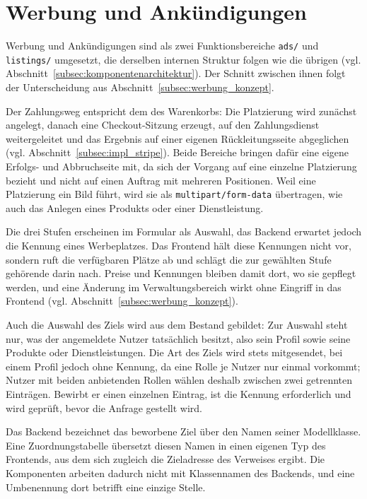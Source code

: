 \section{Werbung und Ankündigungen}
\label{sec:impl_werbung}

Werbung und Ankündigungen sind als zwei Funktionsbereiche
\texttt{ads/} und \texttt{listings/} umgesetzt, die derselben
internen Struktur folgen wie die übrigen (vgl.
Abschnitt~\ref{subsec:komponentenarchitektur}). Der Schnitt zwischen
ihnen folgt der Unterscheidung aus
Abschnitt~\ref{subsec:werbung_konzept}.

Der Zahlungsweg entspricht dem des Warenkorbs: Die Platzierung wird
zunächst angelegt, danach eine Checkout-Sitzung erzeugt, auf den
Zahlungsdienst weitergeleitet und das Ergebnis auf einer eigenen
Rückleitungsseite abgeglichen (vgl.
Abschnitt~\ref{subsec:impl_stripe}). Beide Bereiche bringen dafür
eine eigene Erfolgs- und Abbruchseite mit, da sich der Vorgang auf
eine einzelne Platzierung bezieht und nicht auf einen Auftrag mit
mehreren Positionen. Weil eine Platzierung ein Bild führt, wird sie
als \texttt{multipart/form-data} übertragen, wie auch das Anlegen
eines Produkts oder einer Dienstleistung.

Die drei Stufen erscheinen im Formular als Auswahl, das Backend
erwartet jedoch die Kennung eines Werbeplatzes. Das Frontend hält
diese Kennungen nicht vor, sondern ruft die verfügbaren Plätze ab und
schlägt die zur gewählten Stufe gehörende darin nach. Preise und
Kennungen bleiben damit dort, wo sie gepflegt werden, und eine
Änderung im Verwaltungsbereich wirkt ohne Eingriff in das Frontend
(vgl. Abschnitt~\ref{subsec:werbung_konzept}).

Auch die Auswahl des Ziels wird aus dem Bestand gebildet: Zur Auswahl
steht nur, was der angemeldete Nutzer tatsächlich besitzt, also sein
Profil sowie seine Produkte oder Dienstleistungen. Die Art des Ziels
wird stets mitgesendet, bei einem Profil jedoch ohne Kennung, da eine
Rolle je Nutzer nur einmal vorkommt; Nutzer mit beiden anbietenden
Rollen wählen deshalb zwischen zwei getrennten Einträgen. Bewirbt er
einen einzelnen Eintrag, ist die Kennung erforderlich und wird
geprüft, bevor die Anfrage gestellt wird.

Das Backend bezeichnet das beworbene Ziel über den Namen seiner
Modellklasse. Eine Zuordnungstabelle übersetzt diesen Namen in einen
eigenen Typ des Frontends, aus dem sich zugleich die Zieladresse des
Verweises ergibt. Die Komponenten arbeiten dadurch nicht mit
Klassennamen des Backends, und eine Umbenennung dort betrifft eine
einzige Stelle.

